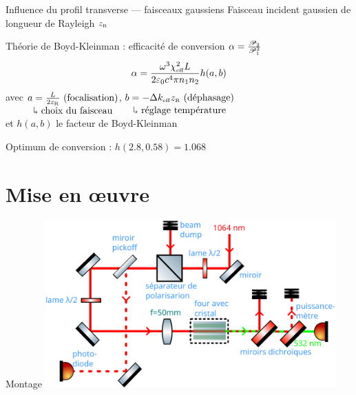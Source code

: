 \documentclass{beamer}
\newcommand{\lmbd}[1]{\SI{#1}{\nano\metre}}
\newcommand{\zr}{z_\mathsc{R}}
\newcommand{\chie}{\chi_\mathsc{eff}}
\begin{document}
\begin{frame}{Influence du profil transverse --- faisceaux gaussiens}
Faisceau incident gaussien de longueur de Rayleigh $\zr$%

Théorie de Boyd-Kleinman : efficacité de conversion $\alpha = \frac{\P_2}{\P_1^2}$
\begin{align*}
\alpha = \frac{\omega^3 \chie^2 L}{2 \varepsilon_0 c^4 \pi n_1 n_2} h(a,b)
\end{align*}
avec $\underset{\text{\normalsize \rotatebox[origin=c]{180}{$\Lsh$} choix du faisceau}}{a=\frac{L}{2z_{\mathsc R}} \text{  (focalisation)}}$, $\underset{\text{\normalsize \rotatebox[origin=c]{180}{$\Lsh$} réglage température}}{b=- \Delta k_\mathsc{eff} z_\mathsc{R} \text{ (déphasage)}\vphantom{\frac{L}{2z_{\mathsc R}}}}$\\
et $h(a,b)$ le facteur de Boyd-Kleinman
\end{frame}

\begin{frame}{Optimum de conversion : $h(2.8,0.58)=1.068$}
\centering

\end{frame}

\section{Mise en \oe uvre}

\begin{frame}{Montage}
\centering
\includegraphics[height=6.4cm]{img/schema.pdf}
\end{frame}
\end{document}
